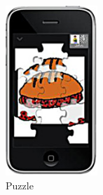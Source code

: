 \begin{figure}[!hbt]
\begin{subfigure}{0.19\textwidth}
        \includegraphics[width=\textwidth]{poten4}
        \caption{Puzzle}
    \end{subfigure}\hspace{0.1\textwidth}
\begin{subfigure}{0.19\textwidth}

\end{subfigure}
\end{figure}
